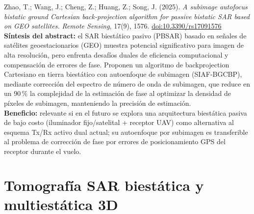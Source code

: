 \documentclass[11pt,a4paper]{article}
\begin{document}
\begin{enumerate}[label=\textbf{[B\arabic*]}, leftmargin=2.2cm, itemsep=10pt]
\item Zhao, T.; Wang, J.; Cheng, Z.; Huang, Z.; Song, J. (2025). \textit{A
subimage autofocus bistatic ground Cartesian back-projection algorithm for
passive bistatic SAR based on GEO satellites.} \emph{Remote Sensing}, 17(9),
1576. \href{https://doi.org/10.3390/rs17091576}{doi:10.3390/rs17091576}
\cite{zhao2025}\\
\textbf{Síntesis del abstract:} el SAR biestático pasivo (PBSAR) basado en
señales de satélites geoestacionarios (GEO) muestra potencial significativo
para imagen de alta resolución, pero enfrenta desafíos duales de
eficiencia computacional y compensación de errores de fase. Proponen un
algoritmo de backprojection Cartesiano en tierra biestático con
autoenfoque de subimagen (SIAF-BGCBP), mediante corrección del espectro de
número de onda de subimagen, que reduce en un 90\,\% la complejidad de la
estimación de fase al optimizar la densidad de píxeles de subimagen,
manteniendo la precisión de estimación.\\
\textbf{Beneficio:} relevante si en el futuro se explora una arquitectura
biestática pasiva de bajo costo (iluminador fijo/satelital + receptor UAV)
como alternativa al esquema Tx/Rx activo dual actual; su autoenfoque por
subimagen es transferible al problema de corrección de fase por errores de
posicionamiento GPS del receptor durante el vuelo.

\end{enumerate}

\section{Tomografía SAR biestática y multiestática 3D}
\label{sec:tomografia}
\end{document}
